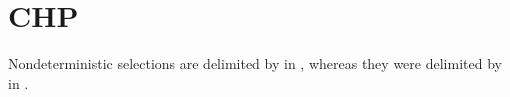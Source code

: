 
\section{CHP}
\label{sec:chp}

Nondeterministic selections are delimited by \ttt{:} in \hac, 
whereas they were delimited by \ttt{|} in \CAST.  


